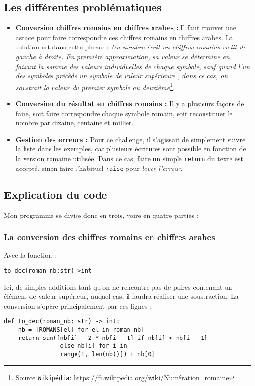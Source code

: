 \subsection*{Les différentes problématiques}
\begin{itemize}
	\item[\textbullet] \textbf{Conversion chiffres romains en chiffres arabes :} Il faut trouver une astuce pour faire correspondre ces chiffres romains en chiffres arabes. La solution est dans cette phrase : \og \textit{Un nombre écrit en chiffres romains se lit de gauche à droite. En première approximation, sa valeur se détermine en faisant la somme des valeurs individuelles de chaque symbole, sauf quand l'un des symboles précède un symbole de valeur supérieure ; dans ce cas, on soustrait la valeur du premier symbole au deuxième}\fg{}\footnote{Source \texttt{Wikipédia}: \url{https://fr.wikipedia.org/wiki/Numération_romaine}}.
	\item[\textbullet] \textbf{Conversion du résultat en chiffres romains :} Il y a plusieurs façons de faire, soit faire correspondre chaque symbole romain, soit reconstituer le nombre par dizaine, centaine et millier.
	\item[\textbullet] \textbf{Gestion des erreurs :} Pour ce challenge, il s'agissait de simplement suivre la liste dans les exemples, car plusieurs écritures sont possible en fonction de la version romaine utilisée. Dans ce cas, faire un simple \texttt{return} du texte est accepté, sinon faire l'habituel \texttt{raise} pour \textit{lever l'erreur}.
\end{itemize}
\medskip

\subsection*{Explication du code}
Mon programme se divise donc en trois, voire en quatre parties :
\medskip

\subsubsection*{La conversion des chiffres romains en chiffres arabes}
Avec la fonction :
\begin{verbatim}
to_dec(roman_nb:str)->int
\end{verbatim}
\medskip

Ici, de simples additions tant qu'on ne rencontre pas de paires contenant un élément de valeur supérieur, auquel cas, il faudra réaliser une soustraction.
La conversion s'opère principalement par ces lignes :
\begin{lstlisting}
def to_dec(roman_nb: str) -> int:
    nb = [ROMANS[el] for el in roman_nb]
    return sum([nb[i] - 2 * nb[i - 1] if nb[i] > nb[i - 1]
                else nb[i] for i in
                range(1, len(nb))]) + nb[0]
\end{lstlisting}
\medskip

